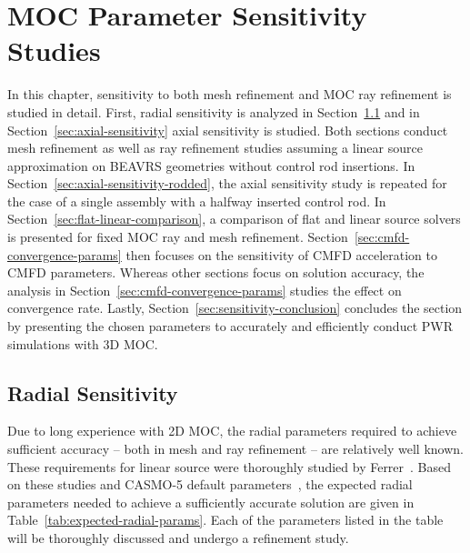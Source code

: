 \chapter{MOC Parameter Sensitivity Studies}
\label{chap:moc-sensitivity}

In this chapter, sensitivity to both mesh refinement and \ac{MOC} ray refinement is studied in detail. First, radial sensitivity is analyzed in Section~\ref{sec:radial-sensitivity} and in Section~\ref{sec:axial-sensitivity} axial sensitivity is studied. Both sections conduct mesh refinement as well as ray refinement studies assuming a linear source approximation on BEAVRS geometries without control rod insertions. In Section~\ref{sec:axial-sensitivity-rodded}, the axial sensitivity study is repeated for the case of a single assembly with a halfway inserted control rod. In Section~\ref{sec:flat-linear-comparison}, a comparison of flat and linear source solvers is presented for fixed \ac{MOC} ray and mesh refinement. Section~\ref{sec:cmfd-convergence-params} then focuses on the sensitivity of \ac{CMFD} acceleration to \ac{CMFD} parameters. Whereas other sections focus on solution accuracy, the analysis in Section~\ref{sec:cmfd-convergence-params} studies the effect on convergence rate. Lastly, Section~\ref{sec:sensitivity-conclusion} concludes the section by presenting the chosen parameters to accurately and efficiently conduct \ac{PWR} simulations with 3D \ac{MOC}.

\section{Radial Sensitivity}
\label{sec:radial-sensitivity}

Due to long experience with 2D \ac{MOC}, the radial parameters required to achieve sufficient accuracy -- both in mesh and ray refinement -- are relatively well known. These requirements for linear source were thoroughly studied by Ferrer~\cite{ferrer2012linear}. Based on these studies and CASMO-5 default parameters~\cite{rhodes2006casmo}, the expected radial parameters needed to achieve a sufficiently accurate solution are given in Table~\ref{tab:expected-radial-params}. Each of the parameters listed in the table will be thoroughly discussed and undergo a refinement study.

